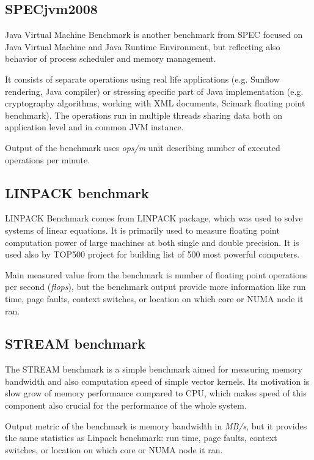 \subsection{SPECjvm2008}
Java Virtual Machine Benchmark\;\cite{jvm2008} is another benchmark from SPEC
focused on Java Virtual Machine and Java Runtime Environment, but reflecting
also behavior of process scheduler and memory management.

It consists of separate operations using real life applications (e.g. Sunflow
rendering, Java compiler) or stressing specific part of Java implementation
(e.g. cryptography algorithms, working with XML documents, Scimark floating
point benchmark). The operations run in multiple threads sharing data both on
application level and in common JVM instance.

Output of the benchmark uses \emph{ops/m} unit describing number of executed
operations per minute.

\subsection{LINPACK benchmark}
LINPACK Benchmark\cite{linpack} comes from LINPACK package, which was used to
solve systems of linear equations. It is primarily
used to measure floating point computation power of large machines at both
single and double precision. It is used also by TOP500 project for building list
of 500 most powerful computers.

Main measured value from the benchmark is number of floating point operations per
second (\emph{flops}), but the benchmark output provide more information like
run time, page faults, context switches, or location on which core or NUMA node
it ran.

\subsection{STREAM benchmark}
The STREAM benchmark\;\cite{stream} is a simple benchmark aimed for measuring memory
bandwidth and also computation speed of simple vector kernels. Its motivation is
slow grow of memory performance compared to CPU, which makes speed of this
component also crucial for the performance of the whole system.

Output metric of the benchmark is memory bandwidth in \emph{MB/s}, but it
provides the same statistics as Linpack benchmark: run time, page faults,
context switches, or location on which core or NUMA node it ran.

